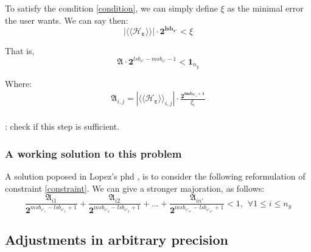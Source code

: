 		To satisfy the condition \ref{condition}, we can simply define $\xi$ as the minimal error the user wants.
		We can say then:
		\begin{equation}
			| \langle\langle \mathcal{H}_{\boldsymbol{\varepsilon}} \rangle\rangle| \cdot \boldsymbol{2^{lsb_{v'}}} < \xi
		\end{equation}

		That is, 
		\begin{equation}
			\boldsymbol{\mathfrak{A}} \cdot \boldsymbol{2}^{lsb_{v'}-msb_{v'}-1} < \boldsymbol{1}_{n_y}
		\end{equation}

		Where:
		\begin{eqnarray} \label{constraint}
			\boldsymbol{\mathfrak{A}}_{i,j}= | \langle\langle \mathcal{H}_{\boldsymbol{\varepsilon}} \rangle\rangle_{i,j} | \cdot \frac{\boldsymbol{2^{msb_{v'_j}+1}}}{\xi_i} \\
		\end{eqnarray}

		\TODO: check if this step is sufficient.

		\subsubsection{A working solution to this problem}
		A solution poposed in Lopez's phd \cite{}, is to consider the following reformulation of constraint \ref{constraint}.
		We can give a stronger majoration, as follows:
		\begin{equation}
			\frac{\mathfrak{A}_{i1}}{\boldsymbol{2}^{msb_{v'_1}-lsb_{v'_1}+1}} + \frac{\mathfrak{A}_{i2}}{\boldsymbol{2}^{msb_{v'_2}-lsb_{v'_2}+1}} + \dots + \frac{\mathfrak{A}_{in'}}{\boldsymbol{2}^{msb_{v'_{n'}}-lsb_{v'_{n'}}+1}} < 1, \hspace{5pt} \forall 1 \leq i \leq n_y 
		\end{equation}
		










	\subsection{Adjustments in arbitrary precision}

